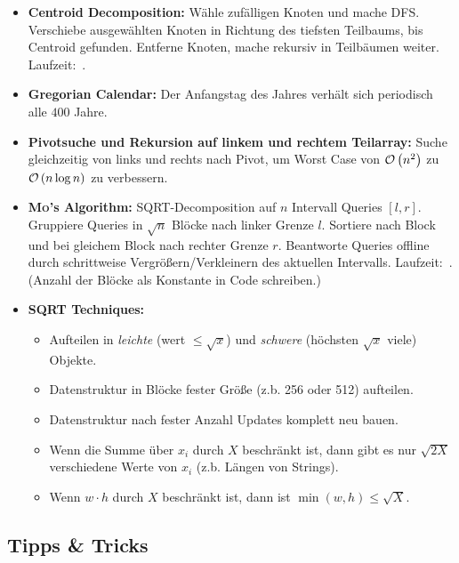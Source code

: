 \begin{itemize}
	\item \textbf{Centroid Decomposition:}
	Wähle zufälligen Knoten und mache DFS.
	Verschiebe ausgewählten Knoten in Richtung des tiefsten Teilbaums, bis Centroid gefunden. Entferne Knoten, mache rekursiv in Teilbäumen weiter. Laufzeit:~.
	\item \textbf{Gregorian Calendar:} Der Anfangstag des Jahres verhält sich periodisch alle $400$ Jahre.

	\item \textbf{Pivotsuche und Rekursion auf linkem und rechtem Teilarray:}
	Suche gleichzeitig von links und rechts nach Pivot, um Worst Case von
	$\mathcal{O}\left(n^2\right)$ zu $\mathcal{O}\left(n\log n\right)$ zu verbessern.
	
	\item \textbf{\textsc{Mo}'s Algorithm:}
	SQRT-Decomposition auf $n$ Intervall Queries $[l,r]$.
	Gruppiere Queries in $\sqrt{n}$ Blöcke nach linker Grenze $l$.
	Sortiere nach Block und bei gleichem Block nach rechter Grenze $r$.
	Beantworte Queries offline durch schrittweise Vergrößern/Verkleinern des aktuellen Intervalls.
	Laufzeit:~.
	(Anzahl der Blöcke als Konstante in Code schreiben.)
	
	\item \textbf{SQRT Techniques:}
	\begin{itemize}
		\item Aufteilen in \emph{leichte} (wert $\leq\sqrt{x}$) und \emph{schwere} (höchsten $\sqrt{x}$ viele) Objekte.
		\item Datenstruktur in Blöcke fester Größe (z.b. 256 oder 512) aufteilen.
		\item Datenstruktur nach fester Anzahl Updates komplett neu bauen.
		\item Wenn die Summe über $x_i$ durch $X$ beschränkt ist, dann gibt es nur $\sqrt{2X}$ verschiedene Werte von $x_i$ (z.b. Längen von Strings).
		\item Wenn $w\cdot h$ durch $X$ beschränkt ist, dann ist $\min(w,h)\leq\sqrt{X}$.
	\end{itemize}
\end{itemize}

\subsection{Tipps \& Tricks}

